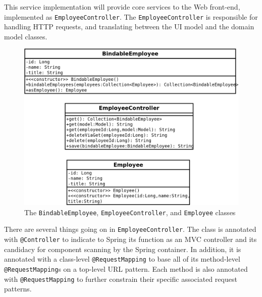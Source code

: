 \documentclass{article}
\begin{document}


This service implementation will provide core services to the Web front-end, implemented as \texttt{EmployeeController}.  The \texttt{EmployeeController} is responsible for handling HTTP requests, and translating between the UI model and the domain model classes.

\vspace{10pt}
\begin{figure}[H]
\begin{center}
\includegraphics[scale=0.5]{images/core/class-EmployeeController-BindableEmployee-Employee.png}
\end{center}
\caption{The \texttt{BindableEmployee}, \texttt{EmployeeController}, and \texttt{Employee} classes}
\label{fig:core/EmployeeController-BindableEmployee-Employee}
\end{figure}



There are several things going on in \texttt{EmployeeController}.  The class is annotated with \texttt{@Controller} to indicate to Spring its function as an MVC controller and its candidacy for component scanning by the Spring container.  In addition, it is annotated with a class-level \texttt{@RequestMapping} to base all of its method-level \texttt{@RequestMapping}s on a top-level URL pattern.  Each method is also annotated with \texttt{@RequestMapping} to further constrain their specific associated request patterns.
\end{document}
